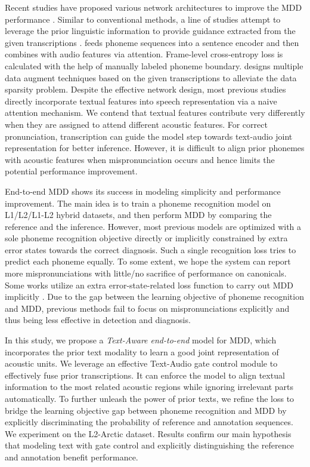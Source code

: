 \documentclass[a4paper]{article}
\begin{document}
Recent studies have proposed various network architectures to improve the MDD performance \cite{leung2019cnn,Yan2020,zheng2021cca,feng2020sed,fu2021full,jiang2021towards}. Similar to conventional methods, a line of studies attempt to leverage the prior linguistic information to provide guidance extracted from the given transcriptions \cite{zheng2021cca,feng2020sed,fu2021full,jiang2021towards}. \cite{feng2020sed} feeds phoneme sequences into a sentence encoder and then combines with audio features via attention. Frame-level cross-entropy loss is calculated with the help of manually labeled phoneme boundary. \cite{fu2021full} designs multiple data augment techniques based on the given transcriptions to alleviate the data sparsity problem. Despite the effective network design, most previous studies directly incorporate textual features into speech representation via a naive attention mechanism. We contend that textual features contribute very differently when they are assigned to attend different acoustic features. For correct pronunciation, transcription can guide the model step towards text-audio joint representation for better inference. However, it is difficult to align prior phonemes with acoustic features when mispronunciation occurs and hence limits the potential performance improvement.

End-to-end MDD shows its success in modeling simplicity and performance improvement. The main idea is to train a phoneme recognition model on L1/L2/L1-L2 hybrid datasets, and then perform MDD by comparing the reference and the inference. However, most previous models are optimized with a sole phoneme recognition objective directly or implicitly constrained by extra error states towards the correct diagnosis. Such a single recognition loss tries to predict each phoneme equally. To some extent, we hope the system can report more mispronunciations with little/no sacrifice of performance on canonicals. Some works utilize an extra error-state-related loss function to carry out MDD implicitly \cite{zheng2021cca}. Due to the gap between the learning objective of phoneme recognition and MDD, previous methods fail to focus on mispronunciations explicitly and thus being less effective in detection and diagnosis.

In this study, we propose a \emph{Text-Aware end-to-end} model for MDD, which incorporates the prior text modality to learn a good joint representation of acoustic units. We leverage an effective Text-Audio gate control module to effectively fuse prior transcriptions. It can enforce the model to align textual information to the most related acoustic regions while ignoring irrelevant parts automatically. To further unleash the power of prior texts, we refine the loss to bridge the learning objective gap between phoneme recognition and MDD by explicitly discriminating the probability of reference and annotation sequences. We experiment on the L2-Arctic dataset. Results confirm our main hypothesis that modeling text with gate control and explicitly distinguishing the reference and annotation benefit performance.
\end{document}
